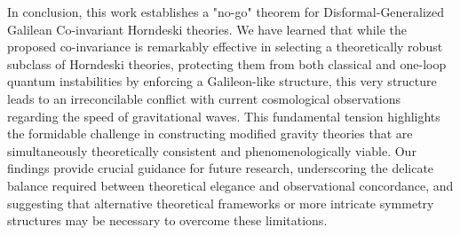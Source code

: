 \documentclass[twocolumn]{aastex631}
\begin{document}
In conclusion, this work establishes a "no-go" theorem for Disformal-Generalized Galilean Co-invariant Horndeski theories. We have learned that while the proposed co-invariance is remarkably effective in selecting a theoretically robust subclass of Horndeski theories, protecting them from both classical and one-loop quantum instabilities by enforcing a Galileon-like structure, this very structure leads to an irreconcilable conflict with current cosmological observations regarding the speed of gravitational waves. This fundamental tension highlights the formidable challenge in constructing modified gravity theories that are simultaneously theoretically consistent and phenomenologically viable. Our findings provide crucial guidance for future research, underscoring the delicate balance required between theoretical elegance and observational concordance, and suggesting that alternative theoretical frameworks or more intricate symmetry structures may be necessary to overcome these limitations.

{}

\end{document}
